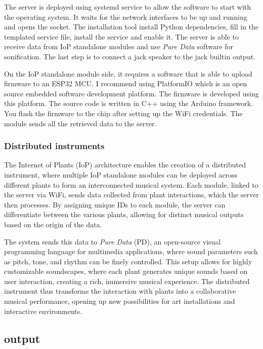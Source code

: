 The server is deployed using systemd service to allow the software to start with the operating system.
It waits for the network interfaces to be up and running and opens the socket.
The installation tool install Python dependencies, fill in the templated service file,
install the service and enable it. The server is able to receive data from IoP standalone
modules and use \textit{Pure Data} software for sonification. The last step is to connect
a jack speaker to the jack builtin output.

On the IoP standalone module side, it requires a software that is able to upload
firmware to an ESP32 MCU. I recommend using PlatformIO which is an open source
embedded software development platform. The firmware is developed using this platform.
The source code is written in C++ using the Arduino framework. You flash the firmware
to the chip after setting up the WiFi credentials.
The module sends all the retrieved data to the server.

\subsubsection{Distributed instruments}

The Internet of Plants (IoP) architecture enables the creation of a distributed instrument, where multiple IoP standalone modules can be deployed across different plants to form an interconnected musical system. Each module, linked to the server via WiFi, sends data collected from plant interactions, which the server then processes. By assigning unique IDs to each module, the server can differentiate between the various plants, allowing for distinct musical outputs based on the origin of the data.

The system sends this data to \textit{Pure Data} (PD), an open-source visual programming language for multimedia applications, where sound parameters such as pitch, tone, and rhythm can be finely controlled. This setup allows for highly customizable soundscapes, where each plant generates unique sounds based on user interaction, creating a rich, immersive musical experience. The distributed instrument thus transforms the interaction with plants into a collaborative musical performance, opening up new possibilities for art installations and interactive environments.

\subsection{output}

